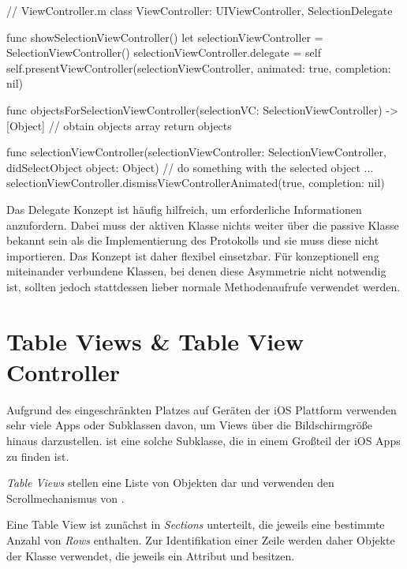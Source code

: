 \documentclass[parskip=half, final]{scrreprt}
\begin{document}
\begin{swiftcode}
// ViewController.m
class ViewController: UIViewController, SelectionDelegate {
    
    func showSelectionViewController() {
        let selectionViewController = SelectionViewController()
        selectionViewController.delegate = self
        self.presentViewController(selectionViewController, animated: true, completion: nil)
    }
    
    func objectsForSelectionViewController(selectionVC: SelectionViewController) -> [Object] {
        // obtain objects array
        return objects
    }

    func selectionViewController(selectionViewController: SelectionViewController, didSelectObject object: Object) {
        // do something with the selected object ...
        selectionViewController.dismissViewControllerAnimated(true, completion: nil)
    }
}
\end{swiftcode}

Das Delegate Konzept ist häufig hilfreich, um erforderliche Informationen anzufordern. Dabei muss der aktiven Klasse nichts weiter über die passive Klasse bekannt sein als die Implementierung des Protokolls und sie muss diese nicht importieren. Das Konzept ist daher flexibel einsetzbar. Für konzeptionell eng miteinander verbundene Klassen, bei denen diese Asymmetrie nicht notwendig ist, sollten jedoch stattdessen lieber normale Methodenaufrufe verwendet werden.

\section{Table Views \& Table View Controller}

Aufgrund des eingeschränkten Platzes auf Geräten der iOS Plattform verwenden sehr viele Apps  oder Subklassen davon, um Views über die Bildschirmgröße hinaus darzustellen.  ist eine solche Subklasse, die in einem Großteil der iOS Apps zu finden ist.

\emph{Table Views} stellen eine Liste von  Objekten dar und verwenden den Scrollmechanismus von .

Eine Table View ist zunächst in \emph{Sections} unterteilt, die jeweils eine bestimmte Anzahl von \emph{Rows} enthalten. Zur Identifikation einer Zeile werden daher Objekte der  Klasse verwendet, die jeweils ein Attribut  und  besitzen.
\end{document}
